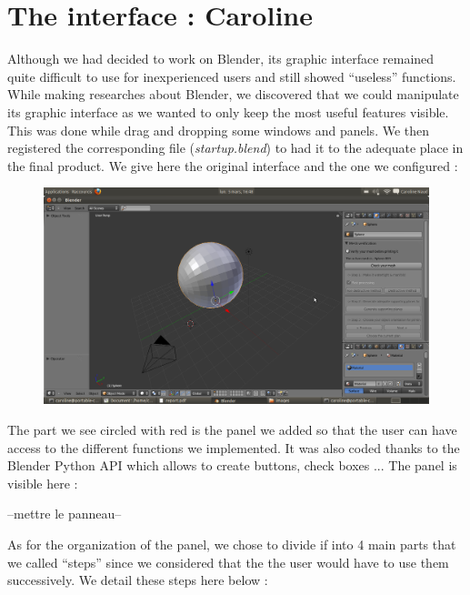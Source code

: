 \documentclass{report}
\begin{document}
\section{The interface : Caroline}

Although we had decided to work on Blender, its graphic interface remained quite difficult to use for inexperienced users and still showed ``useless'' functions. \\
While making researches about Blender, we discovered that we could manipulate its graphic interface as we wanted to only keep the most useful features visible. This was done while drag 	and dropping some windows and panels. We then registered the corresponding file (\textit{startup.blend}) to had it to the adequate place in the final product. We give here the original interface and the one we configured :

\bigskip

\begin{figure}[!h]
\begin{center}
	\includegraphics[scale=0.25]{NotreInterface}
\end{center}
\end{figure}

The part we see circled with red is the panel we added so that the user can have access to the different functions we implemented. It was also coded thanks to the Blender Python API which allows to create buttons, check boxes ... The panel is visible here :

\bigskip
--mettre le panneau--
\bigskip

As for the organization of the panel, we chose to divide if into 4 main parts that we called ``steps'' since we considered that the the user would have to use them successively. We detail these steps here below :
\end{document}
